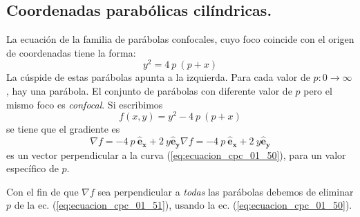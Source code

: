 \subsection*{Coordenadas parabólicas cilíndricas.}
La ecuación de la familia de parábolas confocales, cuyo foco coincide con el origen de coordenadas tiene la forma:
\begin{equation}
y^{2} = 4 \: p \: (p + x)
\label{eq:ecuacion_cpc_01_50}
\end{equation}
La cúspide de estas parábolas apunta a la izquierda. Para cada valor de $p: 0 \to \infty$, hay una parábola. El conjunto de parábolas con diferente valor de $p$ pero el mismo foco es \emph{confocal}. Si escribimos
\[ f(x,y) = y^{2} - 4 \: p \: (p + x) \]
se tiene que el gradiente es
\begin{equation}
\nabla f = - 4 \: p \: \mathbf{\widehat{e}_{x}} + 2 \: y  \mathbf{\widehat{e}_{y}}
\nabla f = - 4 \: p \: \mathbf{\widehat{e}_{x}} + 2 \: y  \mathbf{\widehat{e}_{y}}
\label{eq:ecuacion_cpc_01_51}
\end{equation}
es un vector perpendicular a la curva (\ref{eq:ecuacion_cpc_01_50}), para un valor específico de $p$.
\par
Con el fin de que $\nabla f$ sea perpendicular a \emph{todas} las parábolas debemos de eliminar $p$ de la ec. (\ref{eq:ecuacion_cpc_01_51}), usando la ec. (\ref{eq:ecuacion_cpc_01_50}). 

